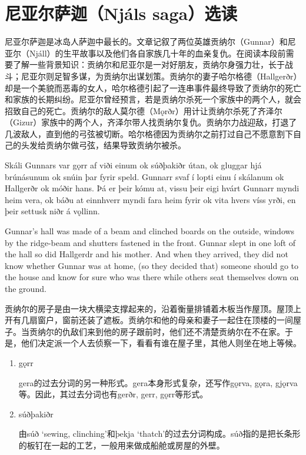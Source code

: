 \section{尼亚尔萨迦（Njáls saga）选读}
尼亚尔萨迦是冰岛人萨迦中最长的。文章记叙了两位英雄贡纳尔（Gunnar）和尼亚尔（Njáll）的生平故事以及他们各自家族几十年的血亲复仇。在阅读本段前需要了解一些背景知识：贡纳尔和尼亚尔是一对好朋友，贡纳尔身强力壮，长于战斗；尼亚尔则足智多谋，为贡纳尔出谋划策。贡纳尔的妻子哈尔格德（Hallgerðr）却是一个美貌而恶毒的女人，哈尔格德引起了一连串事件最终导致了贡纳尔的死亡和家族的长期纠纷。尼亚尔曾经预言，若是贡纳尔杀死一个家族中的两个人，就会招致自己的死亡。贡纳尔的敌人莫尔德（Mǫrðr）用计让贡纳尔杀死了齐泽尔（Gizur）家族中的两个人，齐泽尔带人找贡纳尔复仇。贡纳尔力战迎敌，打退了几波敌人，直到他的弓弦被切断。哈尔格德因为贡纳尔之前打过自己不愿意割下自己的头发给贡纳尔做弓弦，结果导致贡纳尔被杀。
\begin{paracol}{2}
    Skáli Gunnars var gǫrr af viði einum ok súðþakiðr útan, ok gluggar hjá brúnásunum ok snúin þar fyrir speld. Gunnarr svaf í lopti einu í skálanum ok Hallgerðr ok móðir hans. Þá er þeir kómu at, vissu þeir eigi hvárt Gunnarr myndi heim vera, ok báðu at einnhverr myndi fara heim fyrir ok vita hvers víss yrði, en þeir settusk niðr á vǫllinn.

    \switchcolumn

    Gunnar's hall was made of a beam and clinched boards on the outside, windows by the ridge-beam and shutters fastened in the front. Gunnar slept in one loft of the hall so did Hallgerdr and his mother. And when they arrived, they did not know whether Gunnar was at home, (so they decided that) someone should go to the house and know for sure who was there while others seat themselves down on the ground.
\end{paracol}
\begin{translation*}{}
    贡纳尔的房子是由一块大横梁支撑起来的，沿着衡量排铺着木板当作屋顶。屋顶上开有几扇窗户，窗前还装了遮板。贡纳尔和他的母亲和妻子一起住在顶楼的一间屋子。当贡纳尔的仇敌们来到他的房子跟前时，他们还不清楚贡纳尔在不在家。于是，他们决定派一个人去侦察一下，看看有谁在屋子里，其他人则坐在地上等候。
\end{translation*}
\begin{grammar*}{}
    \begin{enumerate}[leftmargin=*]
        \item gǫrr

              gera的过去分词的另一种形式。gera本身形式复杂，还写作gǫrva, gǫra, gjǫrva等。因此，其过去分词也有gerðr, gerr, gǫrr等形式。

        \item súðþakiðr

              由súð `sewing, clinching'和þekja `thatch'的过去分词构成。súð指的是把长条形的板钉在一起的工艺，一般用来做成船舱或房屋的外壁。
    \end{enumerate}
\end{grammar*}

